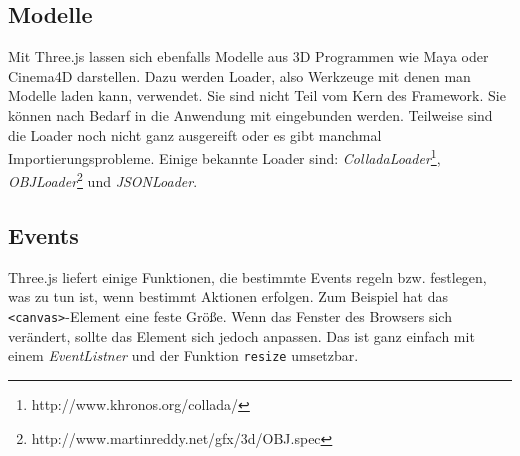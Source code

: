 \subsection{Modelle}
\label{subsec:objekte}
%
Mit Three.js lassen sich ebenfalls Modelle aus 3D Programmen wie Maya oder Cinema4D darstellen. Dazu werden Loader, also Werkzeuge mit denen man Modelle laden kann, verwendet. Sie sind nicht Teil vom Kern des Framework. Sie können nach Bedarf in die Anwendung mit eingebunden werden. Teilweise sind die Loader noch nicht ganz ausgereift oder es gibt manchmal Importierungsprobleme. Einige bekannte Loader sind: \textit{ColladaLoader}\footnote{http://www.khronos.org/collada/}, \textit{OBJLoader}\footnote{http://www.martinreddy.net/gfx/3d/OBJ.spec} und \textit{JSONLoader}.
%
\subsection{Events}
\label{subsec:events}
%
Three.js liefert einige Funktionen, die bestimmte Events regeln bzw. festlegen, was zu tun ist, wenn bestimmt Aktionen erfolgen. Zum Beispiel hat das \texttt{<canvas>}-Element eine feste Größe. Wenn das Fenster des Browsers sich verändert, sollte das Element sich jedoch anpassen. Das ist ganz einfach mit einem \textit{EventListner} und der Funktion \texttt{resize} umsetzbar.
%
%
%
%
%
